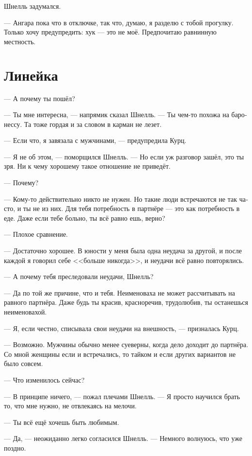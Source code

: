 \documentclass[a4paper,12pt,fleqn]{book}\usepackage{polyglossia}\setdefaultlanguage[babelshorthands=true]{russian}\setotherlanguage{english}\defaultfontfeatures{Ligatures=TeX,Mapping=tex-text}\usepackage{xcolor}\newcommand{\ml}[3]{#2}
\begin{document}
Шнелль задумался.

--- Ангара пока что в отключке, так что, думаю, я разделю с тобой прогулку.
\ml{$0$}
{Только хочу предупредить: хук --- это не моё.}
{Just a fair warning: hook is not my piece of pie.}
\ml{$0$}
{Предпочитаю равнинную местность.}
{I prefer flat terrain.''}

\section{Линейка}

--- А почему ты пошёл?

--- Ты мне интересна, --- напрямик сказал Шнелль.
--- Ты чем-то похожа на баронессу.
Та тоже гордая и за словом в карман не лезет.

--- Если что, я завязала с мужчинами, --- предупредила Курц.

--- Я не об этом, --- поморщился Шнелль.
--- Но если уж разговор зашёл, это ты зря.
Ни к чему хорошему такое отношение не приведёт.

--- Почему?

--- Кому-то действительно никто не нужен.
Но такие люди встречаются не так часто, и ты не из них.
Для тебя потребность в партнёре --- это как потребность в еде.
Даже если тебе больно, ты всё равно ешь, верно?

--- Плохое сравнение.

--- Достаточно хорошее.
В юности у меня была одна неудача за другой, и после каждой я говорил себе <<больше никогда>>, и неудачи всё равно повторялись.

--- А почему тебя преследовали неудачи, Шнелль?

--- Да по той же причине, что и тебя.
Неименоваха не может рассчитывать на равного партнёра.
Даже будь ты красив, красноречив, трудолюбив, ты останешься неименовахой.

--- Я, если честно, списывала свои неудачи на внешность, --- призналась Курц.

--- Возможно.
Мужчины обычно менее суеверны, когда дело доходит до партнёра.
Со мной женщины если и встречались, то тайком и если других вариантов не было совсем.

--- Что изменилось сейчас?

--- В принципе ничего, --- пожал плечами Шнелль.
--- Я просто научился брать то, что мне нужно, не отвлекаясь на мелочи.

--- Ты всё ещё хочешь быть любимым.

--- Да, --- неожиданно легко согласился Шнелль.
--- Немного волнуюсь, что уже поздно.
\end{document}
